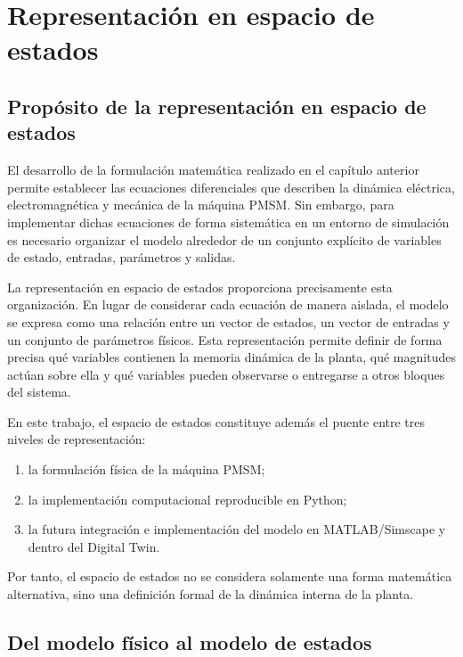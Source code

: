 \section{Representación en espacio de estados}

\subsection{Propósito de la representación en espacio de estados}

El desarrollo de la formulación matemática realizado en el capítulo anterior permite establecer las ecuaciones diferenciales que describen la dinámica eléctrica, electromagnética y mecánica de la máquina PMSM. Sin embargo, para implementar dichas ecuaciones de forma sistemática en un entorno de simulación es necesario organizar el modelo alrededor de un conjunto explícito de variables de estado, entradas, parámetros y salidas.

La representación en espacio de estados proporciona precisamente esta organización. En lugar de considerar cada ecuación de manera aislada, el modelo se expresa como una relación entre un vector de estados, un vector de entradas y un conjunto de parámetros físicos. Esta representación permite definir de forma precisa qué variables contienen la memoria dinámica de la planta, qué magnitudes actúan sobre ella y qué variables pueden observarse o entregarse a otros bloques del sistema.

En este trabajo, el espacio de estados constituye además el puente entre tres niveles de representación:

\begin{enumerate}
    \item la formulación física de la máquina PMSM;
    \item la implementación computacional reproducible en Python;
    \item la futura integración e implementación del modelo en MATLAB/Simscape y dentro del Digital Twin.
\end{enumerate}

Por tanto, el espacio de estados no se considera solamente una forma matemática alternativa, sino una definición formal de la dinámica interna de la planta.

\subsection{Del modelo físico al modelo de estados}

